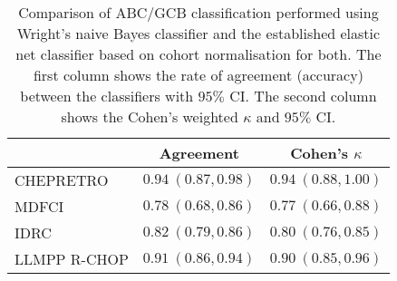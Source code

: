 \begin{table}[!tbp]
{\small
\caption{Comparison of ABC/GCB classification performed using Wright's naive
Bayes classifier \citep{Wright2003} and the established elastic net classifier
based on cohort normalisation
for both. The first column shows the rate of agreement (accuracy) between the
classifiers with $95\%$ CI. The second column shows the Cohen's weighted
$\kappa$ and $95\%$ CI.\label{tab:ABCGCBclassifier}} 
\begin{center}
\begin{tabular}{lll}
\hline\hline
\multicolumn{1}{l}{}&\multicolumn{1}{c}{Agreement}&\multicolumn{1}{c}{Cohen's $\kappa$}\tabularnewline
\hline
CHEPRETRO&$0.94~(0.87, 0.98)$&$0.94~(0.88, 1.00)$\tabularnewline
MDFCI&$0.78~(0.68, 0.86)$&$0.77~(0.66, 0.88)$\tabularnewline
IDRC&$0.82~(0.79, 0.86)$&$0.80~(0.76, 0.85)$\tabularnewline
LLMPP R-CHOP&$0.91~(0.86, 0.94)$&$0.90~(0.85, 0.96)$\tabularnewline
\hline
\end{tabular}\end{center}}

\end{table}
